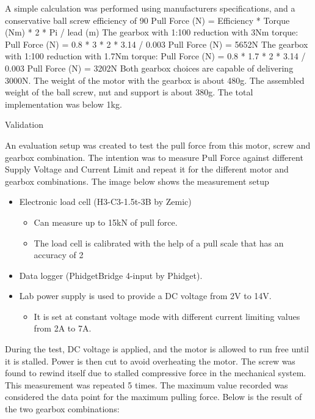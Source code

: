     A simple calculation was performed using manufacturers specifications, and a conservative ball screw efficiency of 90%
Pull Force (N) = Efficiency * Torque (Nm) * 2 * Pi / lead (m)
The gearbox with 1:100 reduction with 3Nm torque:
Pull Force (N) = 0.8 * 3 * 2 * 3.14 / 0.003
Pull Force (N) = 5652N
The gearbox with 1:100 reduction with 1.7Nm torque:
Pull Force (N) = 0.8 * 1.7 * 2 * 3.14 / 0.003
Pull Force (N) = 3202N
Both gearbox choices are capable of delivering 3000N. The weight of the motor with the gearbox is about 480g. The assembled weight of the ball screw, nut and support is about 380g. The total implementation was below 1kg. 

Validation

An evaluation setup was created to test the pull force from this motor, screw and gearbox combination. The intention was to measure Pull Force against different Supply Voltage and Current Limit and repeat it for the different motor and gearbox combinations.
The image below shows the measurement setup
\begin{itemize}
    \item Electronic load cell (H3-C3-1.5t-3B by Zemic)
    \begin{itemize}
        \item Can measure up to 15kN of pull force. 
        \item The load cell is calibrated with the help of a pull scale that has an accuracy of 2%
    \end{itemize}
    \item Data logger (PhidgetBridge 4-input by Phidget). 
    \item Lab power supply is used to provide a DC voltage from 2V to 14V. 
    \begin{itemize}
        \item It is set at constant voltage mode with different current limiting values from 2A to 7A. 
    \end{itemize}
\end{itemize}

During the test, DC voltage is applied, and the motor is allowed to run free until it is stalled. Power is then cut to avoid overheating the motor. The screw was found to rewind itself due to stalled compressive force in the mechanical system. This measurement was repeated 5 times. The maximum value recorded was considered the data point for the maximum pulling force.
Below is the result of the two gearbox combinations:


